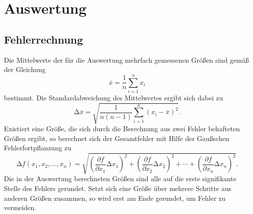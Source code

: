 \section{Auswertung}
\subsection{Fehlerrechnung}
\label{sec:auswertung}
Die Mittelwerte der für die Auswertung mehrfach gemessenen Größen sind
gemäß der Gleichung
\begin{equation}
    \bar{x}=\frac{1}{n}\sum_{i=1}^n x_i
    \label{eq:mittelwert}
\end{equation}
bestimmt. Die Standardabweichung des Mittelwertes ergibt sich dabei zu
\begin{equation}
    \mathup{\Delta}\bar{x}=\sqrt{\frac{1}{n(n-1)}\sum_{i=1}^n\left(x_i-\bar{x}\right)^2}.
    \label{eq:standardabweichung}
\end{equation}
Existiert eine Größe, die sich durch die Berechnung aus zwei Fehler behafteten Größen ergibt,
so berechnet sich der Gesamtfehler mit Hilfe der Gaußschen Fehlerfortpflanzung zu
\begin{equation}
    \mathup{\Delta}f(x_1,x_2,...,x_n)=\sqrt{\left(\frac{\partial f}{\partial x_1}\mathup{\Delta}x_1\right)^2+\left(\frac{\partial f}{\partial x_2}\mathup{\Delta}x_2\right)^2+ \dotsb +\left(\frac{\partial f}{\partial x_n}\mathup{\Delta}x_n\right)^2}.
    \label{eq:fehlerfortpflanzung}
\end{equation}
Die in der Auswertung berechneten Größen sind alle  auf die erste signifikante
Stelle des Fehlers gerundet. Setzt sich eine Größe über mehrere Schritte aus
anderen Größen zusammen, so wird erst am Ende gerundet, um Fehler zu vermeiden.


